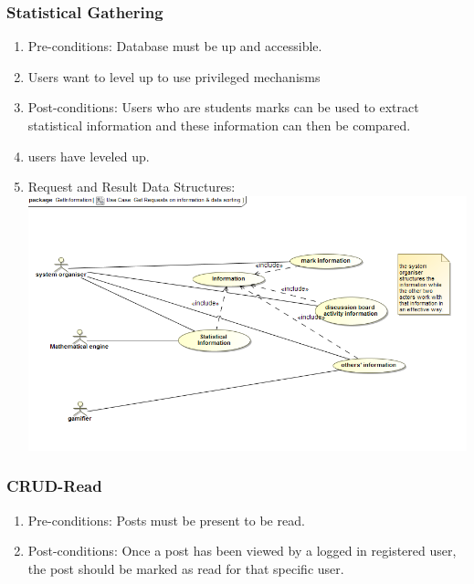 \documentclass[12pt, oneside]{article}
\begin{document}
\subsubsection{Statistical Gathering}
\begin{enumerate}
 \item Pre-conditions: Database must be up and accessible.
 \\
 \item Users want to level up to use privileged mechanisms 
\\

\item Post-conditions: Users who are students marks can be used to extract statistical information and these information can then be compared.
\\  
  \item users have leveled up.
  \\
  
 \item Request and Result Data Structures:\\
  \includegraphics[scale=0.4]{getInformation}\\

\end{enumerate}



\subsubsection{CRUD-Read}
\begin{enumerate}
 \item Pre-conditions: Posts must be present to be read.
 \\
 \item Post-conditions: Once a post has been viewed by a logged in registered user, the post should be marked as read for that specific user.
  \\

\end{enumerate}
\end{document}
